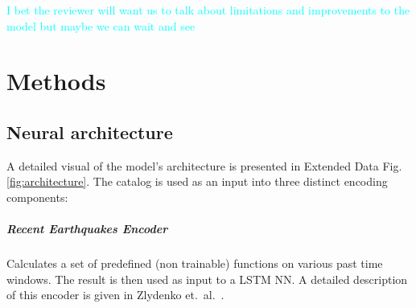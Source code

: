 \documentclass[pdflatex]{sn-jnl}
\newcommand{\neri}[1]{{\textcolor{cyan}{#1}}}
\begin{document}
\neri{I bet the reviewer will want us to talk about limitations and improvements to the model but maybe we can wait and see}


\let\oldbibliography\thebibliography
\renewcommand{\thebibliography}[1]{%
  \oldbibliography{#1}%
  \setlength{\itemsep}{10pt}%
}
% 
% 
\newpage


\let\oldthebibliography=\thebibliography
\let\oldendthebibliography=\endthebibliography
\renewenvironment{thebibliography}[1]{
    \oldthebibliography{#1}
    \setcounter{enumiv}{34}
}{\oldendthebibliography}

\newpage
\unnumbered

\unnumbered
\section{Methods}
\subsection{Neural architecture}
A detailed visual of the model's architecture is presented in Extended Data Fig. \ref{fig:architecture}. The catalog is used as an input into three distinct encoding components:
\subparagraph{\textbf{Recent Earthquakes Encoder}} Calculates a set of predefined (non trainable) functions on various past time windows. The result is then used as input to a LSTM NN. A detailed description of this encoder is given in Zlydenko et.~al.~\cite{zlydenko_neural_2023}. 
\end{document}
